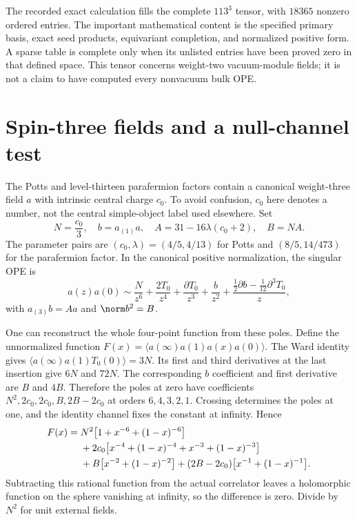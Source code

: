 The recorded exact calculation fills the complete $113^3$ tensor,
with $18365$ nonzero ordered entries. The important mathematical
content is the specified primary basis, exact seed products,
equivariant completion, and normalized positive form. A sparse
table is complete only when its unlisted entries have been proved
zero in that defined space. This tensor concerns weight-two
vacuum-module fields; it is not a claim to have computed every
nonvacuum bulk OPE.

\section{Spin-three fields and a null-channel test}

The Potts and level-thirteen parafermion factors contain a
canonical weight-three field $a$ with intrinsic central charge
$c_0$. To avoid confusion, $c_0$ here denotes a number, not the
central simple-object label used elsewhere. Set
\[
 N=\frac{c_0}{3},\quad b=a_{(1)}a,\quad
 A=31-16\lambda(c_0+2),\quad B=NA.
\]
The parameter pairs are
$(c_0,\lambda)=(4/5,4/13)$ for Potts and
$(8/5,14/473)$ for the parafermion factor.
In the canonical positive normalization, the singular OPE is
\begin{equation}
 a(z)a(0)\sim\frac{N}{z^6}+\frac{2T_0}{z^4}
 +\frac{\partial T_0}{z^3}+\frac b{z^2}
 +\frac{\frac12\partial b-\frac1{12}\partial^3T_0}{z},
 \label{eq:corr-spin3-ope}
\end{equation}
with $a_{(3)}b=Aa$ and $\norm b^2=B$.

One can reconstruct the whole four-point function from these
poles. Define the unnormalized function
$F(x)=\langle a(\infty)a(1)a(x)a(0)\rangle$.
The Ward identity gives
$\langle a(\infty)a(1)T_0(0)\rangle=3N$.
Its first and third derivatives at the last insertion give
$6N$ and $72N$. The corresponding $b$ coefficient and first
derivative are $B$ and $4B$. Therefore the poles at zero have
coefficients $N^2,2c_0,2c_0,B,2B-2c_0$ at orders
$6,4,3,2,1$. Crossing determines the poles at one, and the
identity channel fixes the constant at infinity. Hence
\begin{align}
 F(x)={}&N^2\bigl[1+x^{-6}+(1-x)^{-6}\bigr]\notag\\
 &+2c_0\bigl[x^{-4}+(1-x)^{-4}+x^{-3}+(1-x)^{-3}\bigr]\notag\\
 &+B\bigl[x^{-2}+(1-x)^{-2}\bigr]
 +(2B-2c_0)\bigl[x^{-1}+(1-x)^{-1}\bigr].
 \label{eq:corr-spin3-four}
\end{align}
Subtracting this rational function from the actual correlator
leaves a holomorphic function on the sphere vanishing at infinity,
so the difference is zero. Divide by $N^2$ for unit external fields.

